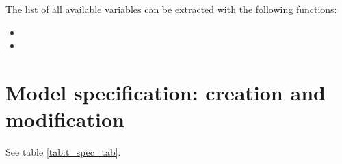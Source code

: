 \documentclass[article]{jss}
\begin{document}
The list of all available variables can be extracted with the following
functions:

\begin{itemize}
\item
\item
\end{itemize}

\hypertarget{user-def-spec}{%
\section{Model specification: creation and
modification}\label{user-def-spec}}

See table \ref{tab:t_spec_tab}.

\begin{table}


\end{table}
\end{document}
